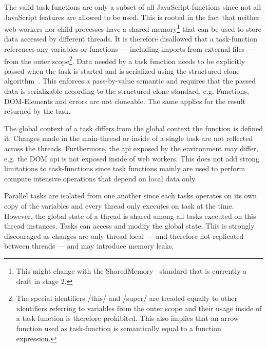The valid task-functions are only a subset of all JavaScript functions since not all JavaScript features are allowed to be used. This is rooted in the fact that neither web workers nor child processes have a shared memory\footnote{This might change with the SharedMemory~\cite{Ecma2016} standard that is currently a draft in stage 2.} that can be used to store data accessed by different threads. It is therefore disallowed that a task-function references any variables or functions --- including imports from external files --- from the outer scope\footnote{The special identifiers \javascriptinline/this/ and \javascriptinline/super/ are treaded equally to other identifiers referring to variables from the outer scope and their usage inside of a task-function is therefore prohibited. This also implies that an arrow function used as task-function is semantically equal to a function expression.}. Data needed by a task function needs to be explicitly passed when the task is started and is serialized using the structured clone algorithm~\cite[Section 2.9.4]{WHATWG2016}. This enforces a pass-by-value semantic and requires that the passed data is serializable according to the structured clone standard, e.g. Functions, DOM-Elements and errors are not cloneable. The same applies for the result returned by the task. 

The global context of a task differs from the global context the function is defined it. Changes made in the main-thread or inside of a single task are not reflected across the threads. Furthermore, the api exposed by the environment may differ, e.g. the DOM api is not exposed inside of web workers. This does not add strong limitations to task-functions since task functions mainly are used to perform compute intensive operations that depend on local data only.

Parallel tasks are isolated from one another since each tasks operates on its own copy of the variables and every thread only executes on task at the time. However, the global state of a thread is shared among all tasks executed on this thread instances. Tasks can access and modify the global state. This is strongly discouraged as changes are only thread local --- and therefore not replicated between threads --- and may introduce memory leaks. 

